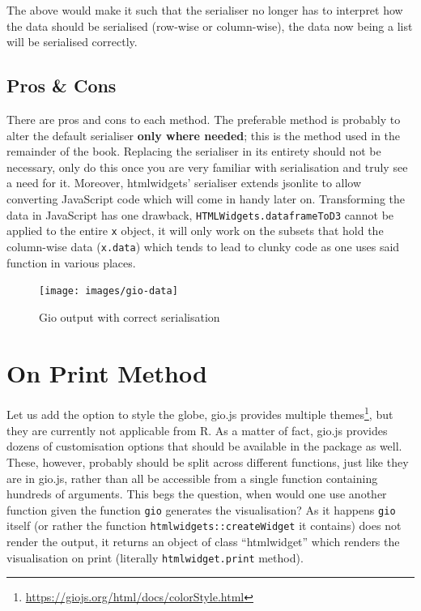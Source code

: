 \documentclass[10pt,]{krantz}
\renewcommand{\href}[2]{#2\footnote{\url{#1}}}
\begin{document}
The above would make it such that the serialiser no longer has to interpret how the data should be serialised (row-wise or column-wise), the data now being a list will be serialised correctly.

\hypertarget{widgets-full-transform-data-conclusion}{%
\subsection{Pros \& Cons}\label{widgets-full-transform-data-conclusion}}

There are pros and cons to each method. The preferable method is probably to alter the default serialiser \textbf{only where needed}; this is the method used in the remainder of the book. Replacing the serialiser in its entirety should not be necessary, only do this once you are very familiar with serialisation and truly see a need for it. Moreover, htmlwidgets' serialiser extends jsonlite to allow converting JavaScript code which will come in handy later on. Transforming the data in JavaScript has one drawback, \texttt{HTMLWidgets.dataframeToD3} cannot be applied to the entire \texttt{x} object, it will only work on the subsets that hold the column-wise data (\texttt{x.data}) which tends to lead to clunky code as one uses said function in various places.

\begin{figure}[H]

{\centering \texttt{[image: images/gio-data]} 

}

\caption{Gio output with correct serialisation}\label{fig:gio-data}
\end{figure}

\hypertarget{widgets-full-on-print}{%
\section{On Print Method}\label{widgets-full-on-print}}

Let us add the option to style the globe, gio.js provides multiple \href{https://giojs.org/html/docs/colorStyle.html}{themes}, but they are currently not applicable from R. As a matter of fact, gio.js provides dozens of customisation options that should be available in the package as well. These, however, probably should be split across different functions, just like they are in gio.js, rather than all be accessible from a single function containing hundreds of arguments. This begs the question, when would one use another function given the function \texttt{gio} generates the visualisation? As it happens \texttt{gio} itself (or rather the function \texttt{htmlwidgets::createWidget} it contains) does not render the output, it returns an object of class ``htmlwidget'' which renders the visualisation on print (literally \texttt{htmlwidget.print} method).
\end{document}

